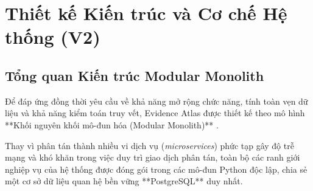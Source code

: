\section{Thiết kế Kiến trúc và Cơ chế Hệ thống (V2)}

\subsection{Tổng quan Kiến trúc Modular Monolith}
Để đáp ứng đồng thời yêu cầu về khả năng mở rộng chức năng, tính toàn vẹn dữ liệu và khả năng kiểm toán truy vết, Evidence Atlas được thiết kế theo mô hình **Khối nguyên khối mô-đun hóa (Modular Monolith)** . 

Thay vì phân tán thành nhiều vi dịch vụ (\textit{microservices}) phức tạp gây độ trễ mạng và khó khăn trong việc duy trì giao dịch phân tán, toàn bộ các ranh giới nghiệp vụ của hệ thống được đóng gói trong các mô-đun Python độc lập, chia sẻ một cơ sở dữ liệu quan hệ bền vững **PostgreSQL** duy nhất.

